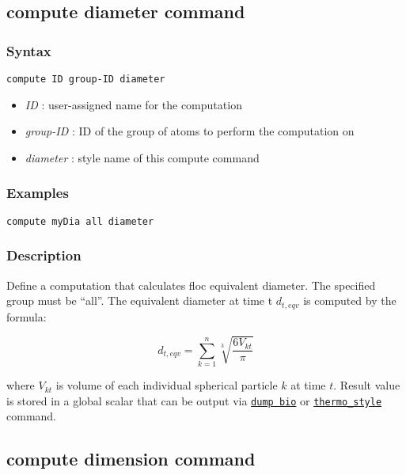 \documentclass[11pt,a4paper,openright]{article}
\begin{document}
\newpage
\subsection{compute diameter command}
\label{cdiameter}

\subsubsection*{Syntax}
\begin{Verbatim}[frame=single]
compute ID group-ID diameter
\end{Verbatim}

\begin{itemize}  [nosep]
\item
	{\it ID }: user-assigned name for the computation
\item
	{\it group-ID }: ID of the group of atoms to perform the computation on
\item
	{\it diameter }: style name of this compute command
\end{itemize}

\subsubsection*{Examples}

\begin{Verbatim}[frame=single]
compute myDia all diameter
\end{Verbatim}

\subsubsection*{Description}

Define a computation that calculates
floc equivalent diameter. 
The specified group must be ``all''.
The equivalent diameter at time t $d_{t,eqv}$ is computed by the formula:

\[ d_{t,eqv} = \sum_{k=1}^{n} \sqrt[3]{\frac{6V_{kt}}{\pi}} \] 

where $V_{kt}$ is volume of each individual spherical particle $k$ at time $t$.
Result value is stored in 
a global scalar that can be output via \hyperref[dumpbio]{\tt dump bio}
or \href{http://lammps.sandia.gov/doc/thermo_style.html}{\tt thermo\_style} command.

\newpage
\subsection{compute dimension command}
\label{cdimension}
\end{document}

